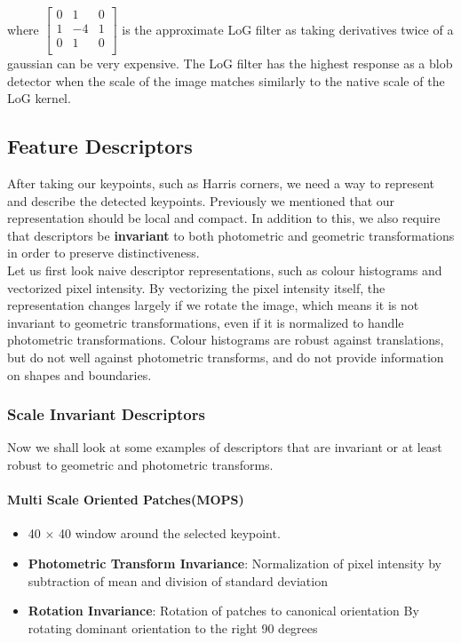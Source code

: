 \documentclass[12pt]{article}
\begin{document}
where $\begin{bmatrix}
0 & 1 & 0\\
1 & -4 & 1\\
0 & 1 & 0\\
\end{bmatrix} $ is the approximate LoG filter as taking derivatives twice of a gaussian can be very expensive. The LoG filter has the highest response as a blob detector when the scale of the image matches similarly to the native scale of the LoG kernel.

\subsection{Feature Descriptors}

After taking our keypoints, such as Harris corners, we need a way to represent and describe the detected keypoints. Previously we mentioned that our representation should be local and compact. In addition to this, we also require that descriptors be \textbf{invariant} to both {photometric and geometric} transformations in order to preserve distinctiveness.\\

Let us first look naive descriptor representations, such as colour histograms and vectorized pixel intensity. By vectorizing the pixel intensity itself, the representation changes largely if we rotate the image, which means it is not invariant to geometric transformations, even if it is normalized to handle photometric transformations. Colour histograms are robust against translations, but do not well against photometric transforms, and do not provide information on shapes and boundaries.\\

\subsubsection{Scale Invariant Descriptors}

Now we shall look at some examples of descriptors that are invariant or at least robust to geometric and photometric transforms.

\paragraph{Multi Scale Oriented Patches(MOPS)}
\begin{itemize}
\item 40 $\times$ 40 window around the selected keypoint.
\item \textbf{Photometric Transform Invariance}: Normalization of pixel intensity by subtraction of mean and division of standard deviation
\item \textbf{Rotation Invariance}: Rotation of patches to canonical orientation By rotating dominant orientation to the right 90 degrees 
\end{itemize}
\end{document}
